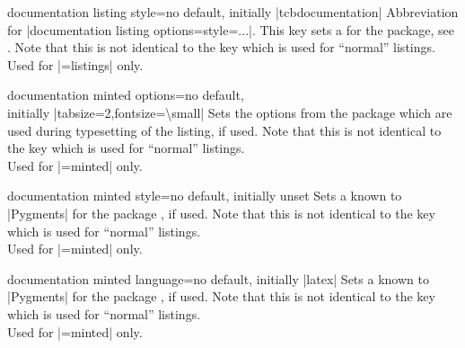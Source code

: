 \begin{docTcbKey}{documentation listing style}{=}{no default, initially |tcbdocumentation|}
  Abbreviation for |documentation listing options={style=...}|.
  This key sets a 
  for the  package, see \cite{hoffmann:listings}.
  Note that this is not identical to the key
   which is used for \enquote{normal} listings.\\
  Used for |=listings| only.
\end{docTcbKey}

\begin{docTcbKey}{documentation minted options}{=}{no default,\\\hspace*{\fill} initially |tabsize=2,fontsize=\textbackslash small|}
  Sets the options from the package  \cite{poore:minted}
  which are used during typesetting of the listing, if used.
  Note that this is not identical to the key
   which is used for \enquote{normal} listings.\\
  Used for |=minted| only.
\end{docTcbKey}

\begin{docTcbKey}{documentation minted style}{=}{no default, initially unset}
  Sets a  known to |Pygments| \cite{pygments:web} for
  the package  \cite{poore:minted}, if used.
  Note that this is not identical to the key
   which is used for \enquote{normal} listings.\\
  Used for |=minted| only.
\end{docTcbKey}

\begin{docTcbKey}[][doc new=2017-04-24]{documentation minted language}{=}{no default, initially |latex|}
  Sets a  known to |Pygments| \cite{pygments:web}
  for the package  \cite{poore:minted}, if used.
  Note that this is not identical to the key
   which is used for \enquote{normal} listings.\\
  Used for |=minted| only.
\end{docTcbKey}

\clearpage


